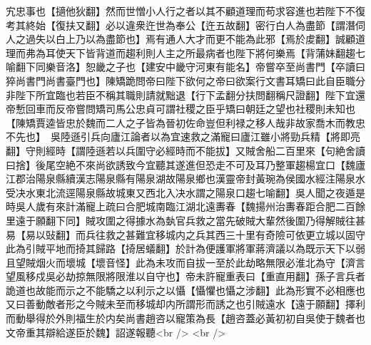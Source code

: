 宄忠事也【擿他狄翻】然而世憎小人行之者以其不顧道理而苟求容進也若陛下不復考其終始【復扶又翻】必以違衆迕世為奉公【迕五故翻】密行白人為盡節【謂潛伺人之過失以白上乃以為盡節也】焉有通人大才而更不能為此邪【焉於䖍翻】誠顧道理而弗為耳使天下皆背道而趨利則人主之所最病者也陛下將何樂焉【背蒲妹翻趨七喻翻下同樂音洛】恕畿之子也【建安中畿守河東有能名】帝嘗卒至尚書門【卒讀曰猝尚書門尚書臺門也】陳矯跪問帝曰陛下欲何之帝曰欲案行文書耳矯曰此自臣職分非陛下所宜臨也若臣不稱其職則請就黜退【行下孟翻分扶問翻稱尺證翻】陛下宜還帝慙回車而反帝嘗問矯司馬公忠貞可謂社稷之臣乎矯曰朝廷之望也社稷則未知也【陳矯賈逵皆忠於魏而二人之子皆為晉初佐命豈但利禄之移人哉非故家喬木而教忠不先也】　吳陸遜引兵向廬江論者以為宜速救之滿寵曰廬江雖小將勁兵精【將即亮翻】守則經時【謂陸遜若以兵圍守必經時而不能拔】又賊舍船二百里來【句絶舍讀曰捨】後尾空絶不來尚欲誘致今宜聽其遂進但恐走不可及耳乃整軍趨楊宜口【魏廬江郡治陽泉縣續漢志陽泉縣有陽泉湖故陽泉鄉也漢靈帝封黃琬為侯國水經注陽泉水受决水東北流逕陽泉縣故城東又西北入决水謂之陽泉口趨七喻翻】吳人聞之夜遁是時吳人歲有來計滿寵上疏曰合肥城南臨江湖北遠夀春【魏揚州治夀春距合肥二百餘里遠于願翻下同】賊攻圍之得據水為埶官兵救之當先破賊大輩然後圍乃得解賊往甚易【易以䜴翻】而兵往救之甚難宜移城内之兵其西三十里有奇險可依更立城以固守此為引賊平地而掎其歸路【掎居蟻翻】於計為便護軍將軍蔣濟議以為既示天下以弱且望賊烟火而壞城【壞音怪】此為未攻而自拔一至於此劫略無限必淮北為守【濟言望風移戍吳必劫掠無限將限淮以自守也】帝未許寵重表曰【重直用翻】孫子言兵者詭道也故能而示之不能驕之以利示之以懾【懾懼也懾之涉翻】此為形實不必相應也又曰善動敵者形之今賊未至而移城却内所謂形而誘之也引賊遠水【遠于願翻】擇利而動舉得於外則福生於内矣尚書趙咨以寵策為長【趙咨蓋必黃初初自吳使于魏者也文帝重其辯給遂臣於魏】詔遂報聽<br />
<br />
